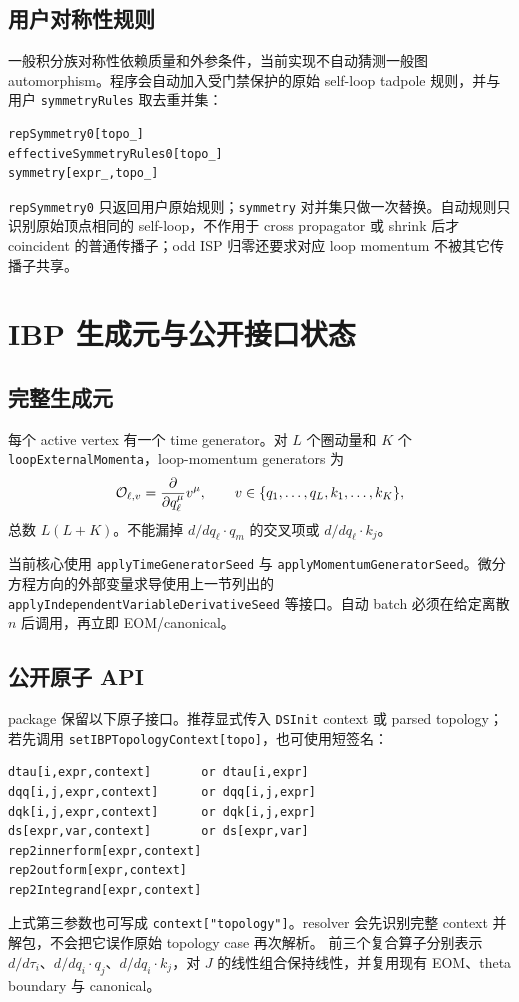 ﻿\documentclass[a4paper,11pt]{article}
\begin{document}
\subsection{用户对称性规则}

一般积分族对称性依赖质量和外参条件，当前实现不自动猜测一般图 automorphism。程序会自动加入受门禁保护的原始 self-loop tadpole 规则，并与用户 \texttt{symmetryRules} 取去重并集：
\begin{verbatim}
repSymmetry0[topo_]
effectiveSymmetryRules0[topo_]
symmetry[expr_,topo_]
\end{verbatim}
\texttt{repSymmetry0} 只返回用户原始规则；\texttt{symmetry} 对并集只做一次替换。自动规则只识别原始顶点相同的 self-loop，不作用于 cross propagator 或 shrink 后才 coincident 的普通传播子；odd ISP 归零还要求对应 loop momentum 不被其它传播子共享。

\section{IBP 生成元与公开接口状态}

\subsection{完整生成元}

每个 active vertex 有一个 time generator。对 $L$ 个圈动量和 $K$ 个 \texttt{loopExternal\allowbreak Momenta}，loop-momentum generators 为
\begin{equation}
 {\cal O}_{\ell,v}
 =\frac{\partial}{\partial q_\ell^\mu}v^\mu,
 \qquad
 v\in\{q_1,\ldots,q_L,k_1,\ldots,k_K\},
\end{equation}
总数 $L(L+K)$。不能漏掉 $d/dq_\ell\cdot q_m$ 的交叉项或 $d/dq_\ell\cdot k_j$。

当前核心使用 \texttt{applyTimeGeneratorSeed} 与 \texttt{applyMomentumGeneratorSeed}。微分方程方向的外部变量求导使用上一节列出的 \texttt{applyIndependentVariableDerivativeSeed} 等接口。自动 batch 必须在给定离散 $n$ 后调用，再立即 EOM/canonical。

\subsection{公开原子 API}

package 保留以下原子接口。推荐显式传入 \texttt{DSInit} context 或 parsed topology；若先调用 \texttt{setIBPTopologyContext[topo]}，也可使用短签名：
\begin{verbatim}
dtau[i,expr,context]       or dtau[i,expr]
dqq[i,j,expr,context]      or dqq[i,j,expr]
dqk[i,j,expr,context]      or dqk[i,j,expr]
ds[expr,var,context]       or ds[expr,var]
rep2innerform[expr,context]
rep2outform[expr,context]
rep2Integrand[expr,context]
\end{verbatim}
上式第三参数也可写成 \texttt{context["topology"]}。resolver 会先识别完整 context 并解包，不会把它误作原始 topology case 再次解析。
前三个复合算子分别表示 $d/d\tau_i$、$d/dq_i\cdot q_j$、$d/dq_i\cdot k_j$，对 $J$ 的线性组合保持线性，并复用现有 EOM、theta boundary 与 canonical。
\end{document}
